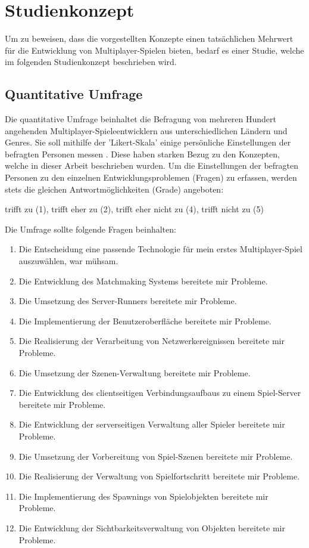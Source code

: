 \chapter{Studienkonzept}
\label{studienkonzept}

Um zu beweisen, dass die vorgestellten Konzepte einen tatsächlichen Mehrwert für die Entwicklung von Multiplayer-Spielen bieten, bedarf es einer Studie, welche im folgenden Studienkonzept beschrieben wird.

\section{Quantitative Umfrage}

Die quantitative Umfrage beinhaltet die Befragung von mehreren Hundert angehenden Multiplayer-Spieleentwicklern aus unterschiedlichen Ländern und Genres. Sie soll mithilfe der 'Likert-Skala' einige persönliche Einstellungen der befragten Personen messen \cite{J.Lorkowski.2013}. Diese haben starken Bezug zu den Konzepten, welche in dieser Arbeit beschrieben wurden. Um die Einstellungen der befragten Personen zu den einzelnen Entwicklungsproblemen (Fragen) zu erfassen, werden stets die gleichen Antwortmöglichkeiten (Grade) angeboten:

trifft zu (1), trifft eher zu (2), trifft eher nicht zu (4), trifft nicht zu (5)

Die Umfrage sollte folgende Fragen beinhalten:

\begin{enumerate}
	\item Die Entscheidung eine passende Technologie für mein erstes Multiplayer-Spiel auszuwählen, war mühsam.
	\item Die Entwicklung des Matchmaking Systems bereitete mir Probleme.
	\item Die Umsetzung des Server-Runners bereitete mir Probleme.
	\item Die Implementierung der Benutzeroberfläche bereitete mir Probleme.
	\item Die Realisierung der Verarbeitung von Netzwerkereignissen bereitete mir Probleme.
	\item Die Umsetzung der Szenen-Verwaltung bereitete mir Probleme.
	\item Die Entwicklung des clientseitigen Verbindungsaufbaus zu einem Spiel-Server bereitete mir Probleme.
	\item Die Entwicklung der serverseitigen Verwaltung aller Spieler bereitete mir Probleme.
	\item Die Umsetzung der Vorbereitung von Spiel-Szenen bereitete mir Probleme.
	\item Die Realisierung der Verwaltung von Spielfortschritt bereitete mir Probleme.
	\item Die Implementierung des Spawnings von Spielobjekten bereitete mir Probleme.
	\item Die Entwicklung der Sichtbarkeitsverwaltung von Objekten bereitete mir Probleme.
\end{enumerate}

